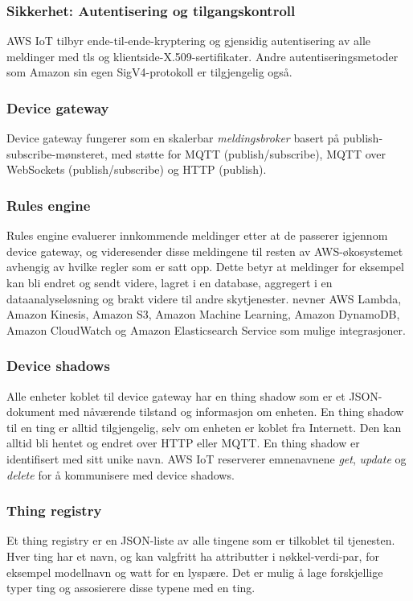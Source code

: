 \subsubsection{Sikkerhet: Autentisering og tilgangskontroll}
AWS IoT tilbyr ende-til-ende-kryptering og gjensidig autentisering av alle meldinger med
\gls{tls} og klientside-X.509-sertifikater. Andre autentiseringsmetoder som Amazon sin egen SigV4-protokoll
er tilgjengelig også.

\subsubsection{Device gateway}
Device gateway fungerer som en skalerbar \textit{meldingsbroker} basert på publish-subscribe-mønsteret,
med støtte for MQTT (publish/subscribe), MQTT over WebSockets (publish/subscribe) og HTTP (publish).

\subsubsection{Rules engine}
Rules engine evaluerer innkommende meldinger etter at de passerer igjennom device gateway,
og videresender disse meldingene til resten av AWS-økosystemet avhengig av hvilke regler som er satt opp.
Dette betyr at meldinger for eksempel kan bli endret og sendt videre, lagret i en database, aggregert i en
dataanalyseløsning og brakt videre til andre skytjenester. \citet{aws_works} nevner AWS Lambda, Amazon Kinesis,
Amazon S3, Amazon Machine Learning, Amazon DynamoDB, Amazon CloudWatch og Amazon Elasticsearch Service som mulige
integrasjoner.

\subsubsection{Device shadows}
Alle enheter koblet til device gateway har en thing shadow som er et JSON-dokument
med nåværende tilstand og informasjon om enheten. En thing shadow til en ting er alltid tilgjengelig,
selv om enheten er koblet fra Internett. Den kan alltid bli hentet og endret over HTTP eller MQTT. En thing shadow
er identifisert med sitt unike navn. AWS IoT reserverer emnenavnene \textit{get}, \textit{update}
og \textit{delete} for å kommunisere med device shadows.

\subsubsection{Thing registry}
Et thing registry er en JSON-liste av alle tingene som er tilkoblet til tjenesten. Hver ting
har et navn, og kan valgfritt ha attributter i nøkkel-verdi-par, for eksempel modellnavn og watt
for en lyspære. Det er mulig å lage forskjellige typer ting og assosierere disse typene med en ting.


